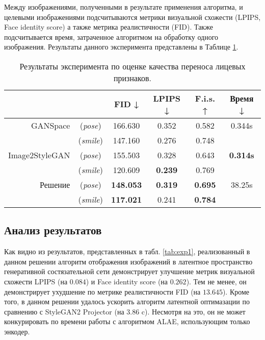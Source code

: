 Между изображениями, полученными в результате применения алгоритма, и целевыми изображениями подсчитываются метрики визуальной схожести (LPIPS, Face identity score) а также метрика реалистичности (FID).
Также подсчитывается время, затраченное алгоритмом на обработку одного изображения.
Результаты данного эксперимента представлены в Таблице \ref{tab:exp2}.

\begin{table}
\begin{center}
  \caption{Результаты эксперимента по оценке качества переноса лицевых признаков.}
  \label{tab:exp2}
  \begin{tabular}{ |r c|c|c|c|c| } 
    \hline
      & & FID ↓ & LPIPS ↓ & F.i.s. ↑ & Время ↓ \\ 
    \hline\hline
    GANSpace & (\emph{pose}) & 166.630 & 0.352 & 0.582 & 0.344s \\
            & (\emph{smile}) & 147.160 & 0.276 & 0.748 &  \\
    \hline
    Image2StyleGAN 
             & (\emph{pose}) & 155.503 & 0.328 & 0.643 & \textbf{0.314s} \\
            & (\emph{smile}) & 120.609 & \textbf{0.239} & 0.769 & \\
    \hline
    Решение  & (\emph{pose}) & \textbf{148.053} & \textbf{0.319} & \textbf{0.695} & 38.25s \\ 
            & (\emph{smile}) & \textbf{117.021} & 0.241 & \textbf{0.784} &  \\ 
    \hline
  \end{tabular}
\end{center}
\end{table}

\subsection{Анализ результатов}

Как видно из результатов, представленных в табл. \ref{tab:exp1}, реализованный в данном решении алгоритм отображения изображений в латентное пространство генеративной состязательной сети демонстрирует улучшение метрик визуальной схожести LPIPS (на $0.084$) и Face identity score (на $0.262$).
Тем не менее, он демонстрирует ухудшение по метрике реалистичности FID (на $13.645$).
Кроме того, в данном решении удалось ускорить алгоритм латентной оптимазации по сравнению с StyleGAN2 Projector (на $3.86$ c). Несмотря на это, он не может конкурировать по времени работы с алгоритмом ALAE, использующим только энкодер.

